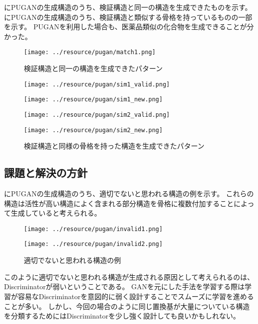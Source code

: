 にPUGANの生成構造のうち、検証構造と同一の構造を生成できたものを示す。
にPUGANの生成構造のうち、検証構造と類似する骨格を持っているものの一部を示す。
PUGANを利用した場合も、医薬品類似の化合物を生成できることが分かった。
\begin{figure}[tbp]
    \centering
    \texttt{[image: ../resource/pugan/match1.png]}
    \caption{検証構造と同一の構造を生成できたパターン} \label{fig:pugan_identical}
\end{figure}
\begin{figure}[tbp]
    \begin{minipage}[b]{0.49\hsize}
    \centering
    \texttt{[image: ../resource/pugan/sim1\_valid.png]} 
    \end{minipage}
    \begin{minipage}[b]{0.49\hsize}    
    \centering
    \texttt{[image: ../resource/pugan/sim1\_new.png]}
    \end{minipage}

    \begin{minipage}[b]{0.49\hsize}    
        \centering
        \texttt{[image: ../resource/pugan/sim2\_valid.png]}
    \end{minipage}
    \begin{minipage}[b]{0.49\hsize}    
        \centering
        \texttt{[image: ../resource/pugan/sim2\_new.png]}
    \end{minipage}
\caption{検証構造と同様の骨格を持った構造を生成できたパターン} \label{fig:pugan_similar}
\end{figure}

\subsection{課題と解決の方針}

にPUGANの生成構造のうち、適切でないと思われる構造の例を示す。
これらの構造は活性が高い構造によく含まれる部分構造を骨格に複数付加することによって生成していると考えられる。
\begin{figure}[tbp]
    \begin{minipage}[b]{1\hsize}
        \centering
        \texttt{[image: ../resource/pugan/invalid1.png]}
    \end{minipage}
    \begin{minipage}[b]{1\hsize}    
        \centering
        \texttt{[image: ../resource/pugan/invalid2.png]}
    \end{minipage}
\caption{適切でないと思われる構造の例} \label{fig:pugan_strange}
\end{figure}

このように適切でないと思われる構造が生成される原因として考えられるのは、Discriminatorが弱いということである。
GANを元にした手法を学習する際は学習が容易なDiscriminatorを意図的に弱く設計することでスムーズに学習を進めることが多い。
しかし、今回の場合のように同じ置換基が大量についている構造を分類するためにはDiscriminatorを少し強く設計しても良いかもしれない。
